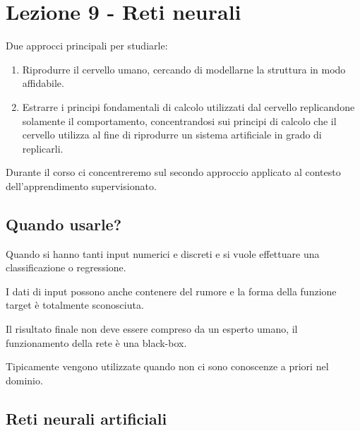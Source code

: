 
\section{Lezione 9 - Reti neurali}\label{lezione-9---reti-neurali}

Due approcci principali per studiarle:

\begin{enumerate}
\item
  Riprodurre il cervello umano, cercando di modellarne la struttura in
  modo affidabile.
\item
  Estrarre i principi fondamentali di calcolo utilizzati dal cervello
  replicandone solamente il comportamento, concentrandosi sui principi
  di calcolo che il cervello utilizza al fine di riprodurre un sistema
  artificiale in grado di replicarli.
\end{enumerate}

Durante il corso ci concentreremo sul secondo approccio applicato al
contesto dell'apprendimento supervisionato.

\subsection{Quando usarle?}\label{quando-usarle}

Quando si hanno tanti input numerici e discreti e si vuole effettuare
una classificazione o regressione.

I dati di input possono anche contenere del rumore e la forma della
funzione target è totalmente sconosciuta.

Il risultato finale non deve essere compreso da un esperto umano, il
funzionamento della rete è una black-box.

Tipicamente vengono utilizzate quando non ci sono conoscenze a priori
nel dominio.

\subsection{Reti neurali artificiali}\label{reti-neurali-artificiali}

